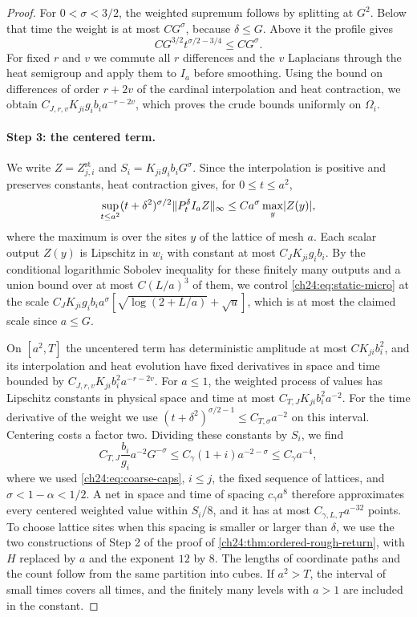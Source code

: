 \begin{proof}
For $0<\sigma<3/2$, the weighted supremum follows by splitting at $G^2$. Below that time the weight is at most $CG^\sigma$, because $\delta\le G$. Above it the profile gives
\[
 CG^{3/2}t^{\sigma/2-3/4}\le CG^\sigma.
\]
For fixed $r$ and $v$ we commute all $r$ differences and the $v$ Laplacians through the heat semigroup and apply them to $I_a$ before smoothing. Using the bound on differences of order $r+2v$ of the cardinal interpolation and heat contraction, we obtain $C_{J,r,v}K_{ji}g_ib_ia^{-r-2v}$, which proves the crude bounds uniformly on $\Omega_i$.

\paragraph{Step 3: the centered term.}
We write $Z=Z_{j,i}^{\mathrm{st}}$ and $S_i=K_{ji}g_ib_iG^\sigma$. Since the interpolation is positive and preserves constants, heat contraction gives, for $0\le t\le a^2$,
\begin{equation}\label{ch24:eq:static-micro}
 \sup_{t\le a^2}(t+\delta^2)^{\sigma/2}\lVert P_t^\delta I_aZ\rVert_\infty\le Ca^\sigma\max_y\lvert Z(y)\rvert,
\end{equation}
where the maximum is over the sites $y$ of the lattice of mesh $a$. Each scalar output $Z(y)$ is Lipschitz in $w_i$ with constant at most $C_JK_{ji}g_ib_i$. By the conditional logarithmic Sobolev inequality for these finitely many outputs and a union bound over at most $C(L/a)^3$ of them, we control \eqref{ch24:eq:static-micro} at the scale $C_JK_{ji}g_ib_ia^\sigma[\sqrt{\log(2+L/a)}+\sqrt u]$, which is at most the claimed scale since $a\le G$.

On $[a^2,T]$ the uncentered term has deterministic amplitude at most $CK_{ji}b_i^2$, and its interpolation and heat evolution have fixed derivatives in space and time bounded by $C_{J,r,v}K_{ji}b_i^2a^{-r-2v}$. For $a\le1$, the weighted process of values has Lipschitz constants in physical space and time at most $C_{T,J}K_{ji}b_i^2a^{-2}$. For the time derivative of the weight we use $(t+\delta^2)^{\sigma/2-1}\le C_{T,\sigma}a^{-2}$ on this interval. Centering costs a factor two. Dividing these constants by $S_i$, we find
\[
 C_{T,J}\frac{b_i}{g_i}a^{-2}G^{-\sigma}\le C_\gamma(1+i)a^{-2-\sigma}\le C_\gamma a^{-4},
\]
where we used \eqref{ch24:eq:coarse-caps}, $i\le j$, the fixed sequence of lattices, and $\sigma<1-\alpha<1/2$. A net in space and time of spacing $c_\gamma a^8$ therefore approximates every centered weighted value within $S_i/8$, and it has at most $C_{\gamma,L,T}a^{-32}$ points. To choose lattice sites when this spacing is smaller or larger than $\delta$, we use the two constructions of Step 2 of the proof of \cref{ch24:thm:ordered-rough-return}, with $H$ replaced by $a$ and the exponent $12$ by $8$. The lengths of coordinate paths and the count follow from the same partition into cubes. If $a^2>T$, the interval of small times covers all times, and the finitely many levels with $a>1$ are included in the constant.


\end{proof}
